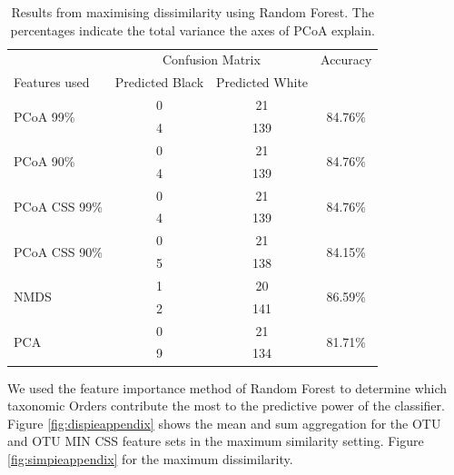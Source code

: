 \begin{table}[h]
	\centering
	\begin{tabular}{l c  c c}
		\toprule
		&\multicolumn{2}{c}{Confusion Matrix} & Accuracy\\
		Features used & Predicted Black&Predicted White&\\
		\midrule
		\multirow{2}{*}{PCoA 99\%} &0 &21&\multirow{2}{*}{84.76\%}\\
		&	4&139&\\
		\cmidrule{2-3}
		\multirow{2}{*}{PCoA 90\%}  &0 &21&\multirow{2}{*}{84.76\%}\\
		&	4&139&\\
		\cmidrule{2-3}
		\multirow{2}{*}{PCoA CSS 99\%}  &0 &21&\multirow{2}{*}{84.76\%}\\
		&	4&139&\\
		\cmidrule{2-3}
		\multirow{2}{*}{PCoA CSS 90\%} &0 &21&\multirow{2}{*}{84.15\%}\\
		&	5&138&\\
		\cmidrule{2-3}
		\multirow{2}{*}{NMDS}&1 &20&\multirow{2}{*}{86.59\%}\\
		&	 2&141&\\
						\cmidrule{2-3}
		\multirow{2}{*}{PCA}&0 &21&\multirow{2}{*}{81.71\%}\\
		&	 9&134&\\
		\bottomrule
	\end{tabular}
	\caption{Results from maximising dissimilarity using Random Forest. The percentages indicate the total variance the axes of PCoA explain.}
	\label{table:rfrdissimilarityappendix}
\end{table}

We used the feature importance method of Random Forest to determine which taxonomic Orders contribute the most to the predictive power of the classifier. Figure \ref{fig:dispieappendix} shows the mean and sum aggregation for the OTU and OTU MIN CSS feature sets in the maximum similarity setting. Figure \ref{fig:simpieappendix} for the maximum dissimilarity.

